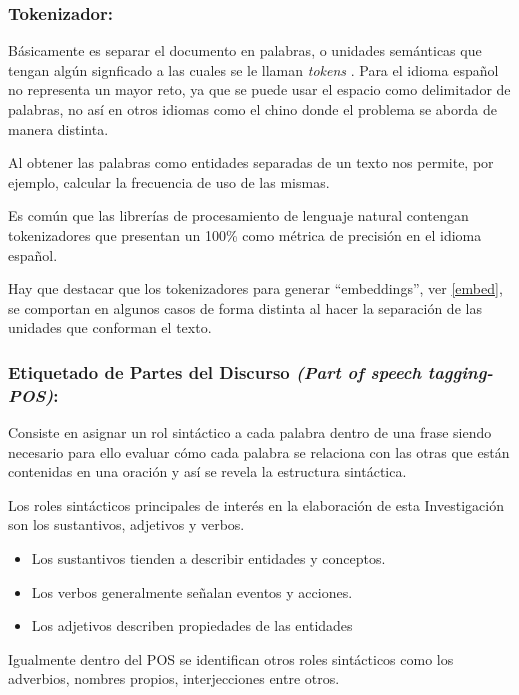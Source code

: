 \documentclass[
  12pt,
  openany]{book}
\begin{document}
\hypertarget{token}{%
\subsubsection{Tokenizador:}\label{token}}

Básicamente es separar el documento en palabras, o unidades semánticas que tengan algún signficado a las cuales se le llaman \emph{tokens} \citep{straka2017}. Para el idioma español no representa un mayor reto, ya que se puede usar el espacio como delimitador de palabras, no así en otros idiomas como el chino donde el problema se aborda de manera distinta.

Al obtener las palabras como entidades separadas de un texto nos permite, por ejemplo, calcular la frecuencia de uso de las mismas.

Es común que las librerías de procesamiento de lenguaje natural contengan tokenizadores que presentan un 100\% como métrica de precisión en el idioma español.

Hay que destacar que los tokenizadores para generar ``embeddings'', ver \ref{embed}, se comportan en algunos casos de forma distinta al hacer la separación de las unidades que conforman el texto.

\hypertarget{pos}{%
\subsubsection{\texorpdfstring{Etiquetado de Partes del Discurso \emph{(Part of speech tagging-POS)}:}{Etiquetado de Partes del Discurso (Part of speech tagging-POS):}}\label{pos}}

Consiste en asignar un rol sintáctico a cada palabra dentro de una frase \citep{eisenstein2019} siendo necesario para ello evaluar cómo cada palabra se relaciona con las otras que están contenidas en una oración y así se revela la estructura sintáctica.

Los roles sintácticos principales de interés en la elaboración de esta Investigación son los sustantivos, adjetivos y verbos.

\begin{itemize}
\item
  Los sustantivos tienden a describir entidades y conceptos.
\item
  Los verbos generalmente señalan eventos y acciones.
\item
  Los adjetivos describen propiedades de las entidades
\end{itemize}

Igualmente dentro del POS se identifican otros roles sintácticos como los adverbios, nombres propios, interjecciones entre otros.
\end{document}
